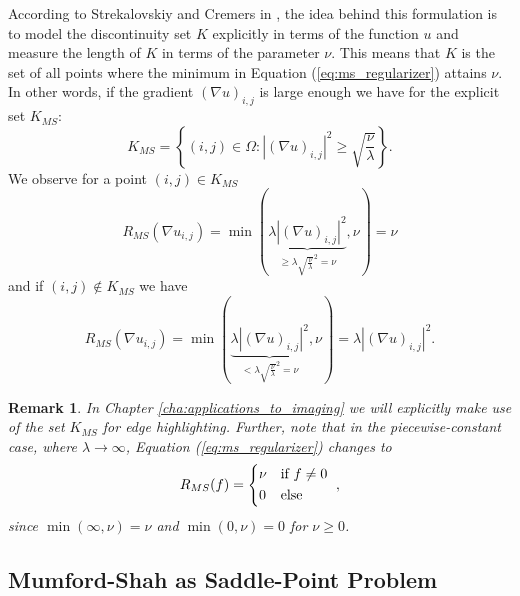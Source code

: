 \documentclass[abstracton]{scrreprt}
\newtheorem{remark}[theorem]{Remark}
\begin{document}
        According to Strekalovskiy and Cremers in \cite{Strekalovskiy-Cremers-eccv14}, the idea behind this formulation is to model the discontinuity set $K$ explicitly in terms of the function $u$ and measure the length of $K$ in terms of the parameter $\nu$. This means that $K$ is the set of all points where the minimum in Equation (\ref{eq:ms_regularizer}) attains $\nu$. In other words, if the gradient $(\nabla u)_{i,j}$ is large enough we have for the explicit set $K_{MS}$:
            \begin{equation}
                K_{MS} = \left\{ (i, j) \in \Omega : |(\nabla u)_{i, j}|^{2} \ge \sqrt{\frac{\nu}{\lambda}} \right\}.
                \label{eq:edge_set_k}
            \end{equation}
        We observe for a point $(i, j) \in K_{MS}$
            $$
                R_{MS}(\nabla u_{i, j}) = \min(\underbrace{\lambda|(\nabla u)_{i, j}|^{2}}_{\ge \lambda \sqrt{\frac{\nu}{\lambda}}^{2} = \nu}, \nu) = \nu
            $$
        and if $(i, j) \notin K_{MS}$ we have
            $$
                R_{MS}(\nabla u_{i, j}) = \min(\underbrace{\lambda|(\nabla u)_{i, j}|^{2}}_{< \lambda \sqrt{\frac{\nu}{\lambda}}^{2} = \nu}, \nu) = \lambda|(\nabla u)_{i, j}|^{2}.
            $$
        \begin{remark}
            In Chapter \ref{cha:applications_to_imaging} we will explicitly make use of the set $K_{MS}$ for edge highlighting. Further, note that in the piecewise-constant case, where $\lambda \to \infty$, Equation (\ref{eq:ms_regularizer}) changes to
                $$
                    R_{MS}(f) = 
                        \begin{dcases*}
                            \nu & \textnormal{if $f \ne 0$} \\
                            0 & \textnormal{else}
                        \end{dcases*},
                $$
            since $\min(\infty, \nu) = \nu$ and $\min(0, \nu) = 0$ for $\nu \ge 0$.
        \end{remark}

        \subsection{Mumford-Shah as Saddle-Point Problem} %
        \label{sub:mumford_shah_as_saddle_point_problem}
\end{document}
